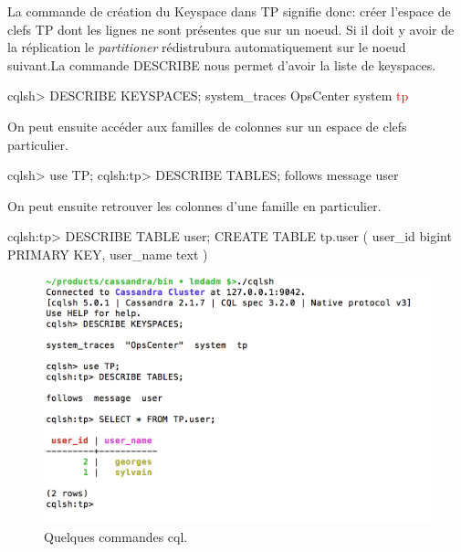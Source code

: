 \par La commande de création du Keyspace dans TP signifie donc: créer l'espace de clefs TP dont les lignes ne sont présentes que sur un noeud.
Si il doit y avoir de la réplication le \textit{partitioner} rédistrubura automatiquement sur le noeud suivant.\newline La commande DESCRIBE nous permet d'avoir la liste de keyspaces.\newline
\begin{tt} 
\indent cqlsh> DESCRIBE KEYSPACES; \newline 
\indent system\_traces  OpsCenter  system  \textcolor{red}{tp}\end{tt}\newline \newline
On peut ensuite accéder aux familles de colonnes sur un espace de clefs particulier.\newline
\begin{tt}
\indent cqlsh> use TP; \newline 
\indent cqlsh:tp> DESCRIBE TABLES;\newline 
\indent follows  message  user\end{tt}\newline \newline
On peut ensuite retrouver les colonnes d'une famille en particulier. \newline
\begin{tt}
\indent cqlsh:tp> DESCRIBE TABLE user; \newline 
\indent CREATE TABLE tp.user (\newline 
\indent \indent user\_id bigint PRIMARY KEY, \newline
\indent \indent user\_name text \newline 
\indent )\end{tt} 

\begin{figure}[h!]
\centering
\includegraphics[scale=0.5]{img/cqlsh.png}
\caption{Quelques commandes cql.}
\end{figure}

